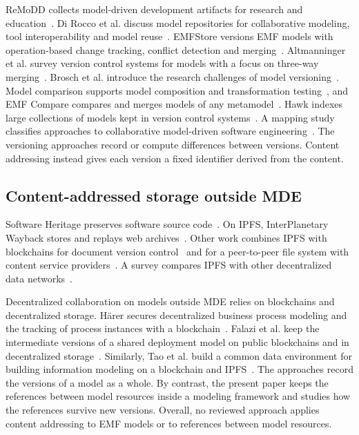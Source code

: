 \documentclass[5p,times,twocolumn]{elsarticle}
\theoremstyle{definition}
\theoremstyle{plain}
\begin{document}
ReMoDD collects model-driven development artifacts for research and education~\cite{france2007remodd}. Di Rocco et al. discuss model repositories for collaborative modeling, tool interoperability and model reuse~\cite{dirocco2015repositories}. EMFStore versions EMF models with operation-based change tracking, conflict detection and merging~\cite{koegel2010emfstore}. Altmanninger et al. survey version control systems for models with a focus on three-way merging~\cite{altmanninger2009survey}. Brosch et al. introduce the research challenges of model versioning~\cite{brosch2012versioning}. Model comparison supports model composition and transformation testing~\cite{kolovos2006comparison}, and EMF Compare compares and merges models of any metamodel~\cite{emfcompare}. Hawk indexes large collections of models kept in version control systems~\cite{barmpis2013hawk}. A mapping study classifies approaches to collaborative model-driven software engineering~\cite{franzago2018collaborative}. The versioning approaches record or compute differences between versions. Content addressing instead gives each version a fixed identifier derived from the content.

\subsection{Content-addressed storage outside MDE}\label{sec:related-content}

Software Heritage preserves software source code~\cite{dicosmo2017heritage}. On IPFS, InterPlanetary Wayback stores and replays web archives~\cite{kelly2016wayback}. Other work combines IPFS with blockchains for document version control~\cite{nizamuddin2019document} and for a peer-to-peer file system with content service providers~\cite{chen2017improved}. A survey compares IPFS with other decentralized data networks~\cite{daniel2022ipfsfriends}.

Decentralized collaboration on models outside MDE relies on blockchains and decentralized storage. H\"arer secures decentralized business process modeling and the tracking of process instances with a blockchain~\cite{harer2018decentralized}. Falazi et al. keep the intermediate versions of a shared deployment model on public blockchains and in decentralized storage~\cite{falazi2018blockchain}. Similarly, Tao et al. build a common data environment for building information modeling on a blockchain and IPFS~\cite{tao2021distributed}. The approaches record the versions of a model as a whole. By contrast, the present paper keeps the references between model resources inside a modeling framework and studies how the references survive new versions. Overall, no reviewed approach applies content addressing to EMF models or to references between model resources.
\end{document}
